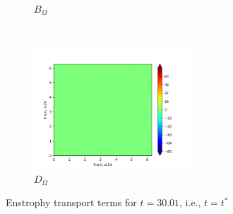 \begin{figure}[H]
\begin{subfigure}{0.45\textwidth}
        \caption{$B_{\Omega}$}
    \end{subfigure}
    ~
    \begin{subfigure}{0.45\textwidth}
        \includegraphics[height=1.75in]{media/run-cds-65/D-enst-1340.png}
        \caption{$D_{\Omega}$}
    \end{subfigure}
    \caption{Enstrophy transport terms for $t=30.01$, i.e., $t=t^{\ast} $}
\end{figure}

\newpage

